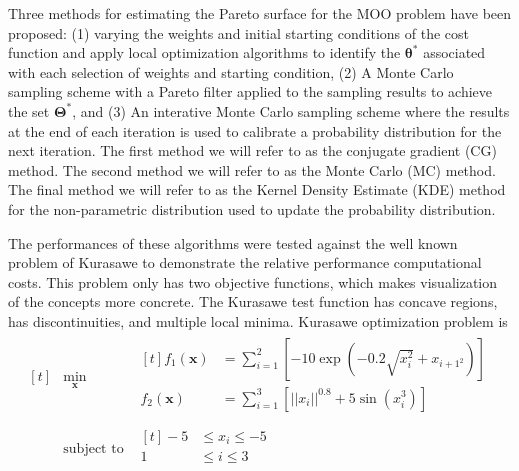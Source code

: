 Three methods for estimating the Pareto surface for the MOO problem have been proposed: (1) varying the weights and initial starting conditions of the cost function and apply local optimization algorithms to identify the $\bm{\theta}^*$ associated with each selection of weights and starting condition, (2) A Monte Carlo sampling scheme with a Pareto filter applied to the sampling results to achieve the set $\bm{\Theta}^*$, and (3) An interative Monte Carlo sampling scheme where the results at the end of each iteration is used to calibrate a probability distribution for the next iteration.  The first method we will refer to as the conjugate gradient (CG) method.  The second method we will refer to as the Monte Carlo (MC) method.  The final method we will refer to as the Kernel Density Estimate (KDE) method for the non-parametric distribution used to update the probability distribution.

 The performances of these algorithms were tested against the well known problem of Kurasawe\cite{kursawe1991_pareto} to demonstrate the relative performance computational costs.  This problem only has two objective functions, which makes visualization of the concepts more concrete.  The Kurasawe test function has concave regions, has discontinuities, and multiple local minima.  Kurasawe optimization problem is
 \begin{equation}
 \begin{aligned}[t]
   &\min_{\bm{x}}
     &\begin{aligned}[t]
       f_1(\bm{x}) &= \sum_{i=1}^2
           \left[
             -10 \exp\left(-0.2 \sqrt{x_i^2} + x_{i+1^2}\right)
           \right] \\
       f_2(\bm{x}) &= \sum_{i=1}^3 \left[ \vert|x_{i} \vert|^{0.8} + 5\sin(x_i^3)\right] \\
     \end{aligned}
   \\
   &\text{subject to}
     &\begin{aligned}[t]
 		      -5 &\leq x_i \leq -5 \\
       		 1 &\leq i   \leq  3 \\
     \end{aligned}
   \end{aligned}
 \end{equation}

